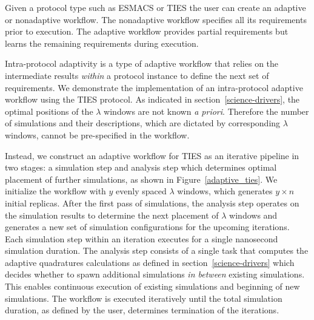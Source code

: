 
Given a protocol type such as ESMACS or TIES the user can create an adaptive or
nonadaptive workflow. The nonadaptive workflow specifies all its requirements 
prior to execution. The adaptive workflow provides partial requirements but 
learns the remaining requirements during execution. 

Intra-protocol adaptivity is a type of adaptive workflow that relies on the 
intermediate results \textit{within} a protocol instance to define the next set 
of requirements. We demonstrate the implementation of an intra-protocol adaptive 
workflow using the TIES protocol. As indicated in section~\ref{science-drivers}, 
the optimal positions of the $\lambda$ windows are not known \textit{a priori}. 
Therefore the number of simulations and their descriptions, which are 
dictated by corresponding $\lambda$ windows, cannot be pre-specified in the 
workflow. 

Instead, we construct an adaptive workflow for TIES as an iterative pipeline in 
two stages: a simulation step and analysis step which determines optimal 
placement of further simulations, as shown in Figure~\ref{adaptive_ties}. We 
initialize the workflow with $y$ evenly spaced $\lambda$ windows, which 
generates $y \times n$ initial replicas. After the first pass of simulations, 
the analysis step operates on the simulation results to determine 
the next placement of $\lambda$ windows and generates a new set of simulation 
configurations for the upcoming iterations. Each simulation step within an 
iteration executes for a single nanosecond simulation duration. The analysis 
step consists of a single task that computes the adaptive quadratures 
calculations as defined in section~\ref{science-drivers} which decides whether 
to spawn additional simulations \textit{in between} existing simulations. This 
enables continuous execution of existing simulations and beginning of new 
simulations. The workflow is executed iteratively until the total simulation 
duration, as defined by the user, determines termination of the iterations. 

